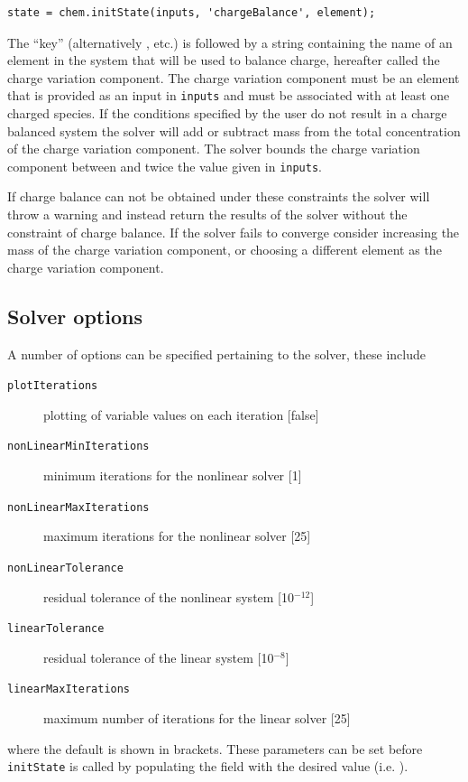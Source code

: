 \documentclass{article}
\begin{document}
\begin{lstlisting}
state = chem.initState(inputs, 'chargeBalance', element);
\end{lstlisting}

The ``key''  (alternatively  ,  etc.) is followed by a string containing the name of an element in the system that will be used to balance charge, hereafter called the charge variation component. The charge variation component must be an element that is provided as an input in \verb|inputs| and must be associated with at least one charged species. If the conditions specified by the user do not result in a charge balanced system the solver will add or subtract mass from the total concentration of the charge variation component. The solver bounds the charge variation component between  and twice the value given in \verb|inputs|. 

If charge balance can not be obtained under these constraints the solver will throw a warning and instead return the results of the solver without the constraint of charge balance. If the solver fails to converge consider increasing the mass of the charge variation component, or choosing a different element as the charge variation component. 

\subsection{Solver options}

A number of options can be specified pertaining to the solver, these include
{\footnotesize
\begin{description}
        \item[\texttt{plotIterations}] plotting of variable values on each iteration [false]
        \item[\texttt{nonLinearMinIterations}]  minimum iterations for the nonlinear solver [1]
        \item[\texttt{nonLinearMaxIterations}]  maximum iterations for the nonlinear solver [25] 
        \item[\texttt{nonLinearTolerance}] residual tolerance of the nonlinear system [10$^{-12}$]
        \item[\texttt{linearTolerance}] residual tolerance of the linear system [10$^{-8}$]
        \item[\texttt{linearMaxIterations}] maximum number of iterations for the linear solver [25]
\end{description}}
where the default is shown in brackets. These parameters can be set before \verb|initState| is called by populating the field with the desired value (i.e. ).
\end{document}
